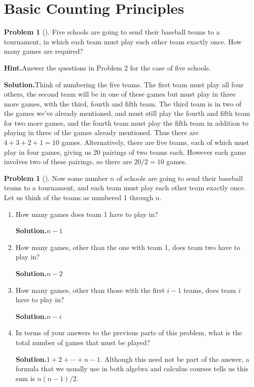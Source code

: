 \documentclass[10pt,]{book}
\theoremstyle{plain}
\theoremstyle{definition}
\newtheorem{activity}[project]{Problem}
\theoremstyle{definition}
\numberwithin{equation}{chapter}
\begin{document}
\section[{Basic Counting Principles}]{Basic Counting Principles}\label{section-2}
\begin{activity}[]\label{fiveteamtournament}
Five schools are going to send their baseball teams to a tournament, in which each team must play each other team exactly once. How many games are required?%
\par\medskip\noindent%
\textbf{Hint.}\quad Answer the questions in Problem 2 for the case of five schools.%
\par\medskip\noindent%
\textbf{Solution.}\quad Think of numbering the five teams. The first team must play all four others, the second team will be in one of these games but must play in three more games, with the third, fourth and fifth team. The third team is in two of the games we've already mentioned, and must still play the fourth and fifth team for two more games, and the fourth team must play the fifth team in addition to playing in three of the games already mentioned. Thus there are \(4+3+2+1 = 10\) games. Alternatively, there are five teams, each of which must play in four games, giving us 20 pairings of two teams each. However each game involves two of these pairings, so there are \(20/2 =10\) games.%
\end{activity}
\begin{activity}[]\label{baseball2}
Now some number \(n\) of schools are going to send their baseball teams to a tournament, and each team must play each other team exactly once. Let us think of the teams as numbered 1 through \(n\).%
\begin{enumerate}[font=\bfseries,label=(\alph*),ref=\alph*]
\item\label{task-1} How many games does  team 1 have to play in?%
\par\medskip\noindent%
\textbf{Solution.}\quad \(n-1\)%
\item\label{task-2} How many games, other than the one with team 1, does team two have to play in?%
\par\medskip\noindent%
\textbf{Solution.}\quad \(n-2\)%
\item\label{task-3} How many games, other than those with the first \(i-1\) teams, does team \(i\) have to play in?%
\par\medskip\noindent%
\textbf{Solution.}\quad \(n-i\)%
\item\label{task-4} In terms of your answers to the previous parts of this problem, what is the total number of games that must be played?%
\par\medskip\noindent%
\textbf{Solution.}\quad \(1+2 +\cdots+ n-1\). Although this need not be part of the answer, a formula that we usually use in both algebra and calculus courses tells us this sum is \(n(n-1)/2\).%
\end{enumerate}
\end{activity}
\end{document}
